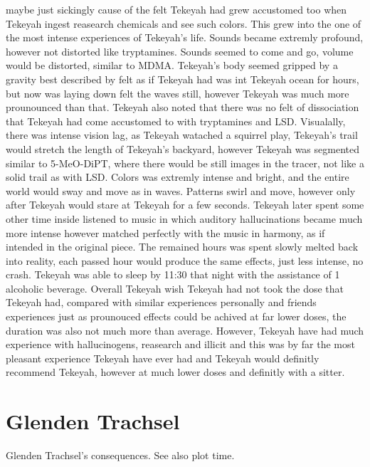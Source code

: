 \documentclass[12pt]{book}
\begin{document}
maybe just sickingly cause of the felt Tekeyah had grew accustomed too when Tekeyah ingest reasearch chemicals and see such colors. This grew into the one of the most intense experiences of Tekeyah's life. Sounds became extremly profound, however not distorted like tryptamines. Sounds seemed to come and go, volume would be distorted, similar to MDMA. Tekeyah's body seemed gripped by a gravity best described by felt as if Tekeyah had was int Tekeyah ocean for hours, but now was laying down felt the waves still, however Tekeyah was much more prounounced than that. Tekeyah also noted that there was no felt of dissociation that Tekeyah had come accustomed to with tryptamines and LSD. Visualally, there was intense vision lag, as Tekeyah watached a squirrel play, Tekeyah's trail would stretch the length of Tekeyah's backyard, however Tekeyah was segmented similar to 5-MeO-DiPT, where there would be still images in the tracer, not like a solid trail as with LSD. Colors was extremly intense and bright, and the entire world would sway and move as in waves. Patterns swirl and move, however only after Tekeyah would stare at Tekeyah for a few seconds. Tekeyah later spent some other time inside listened to music in which auditory hallucinations became much more intense however matched perfectly with the music in harmony, as if intended in the original piece. The remained hours was spent slowly melted back into reality, each passed hour would produce the same effects, just less intense, no crash. Tekeyah was able to sleep by 11:30 that night with the assistance of 1 alcoholic beverage. Overall Tekeyah wish Tekeyah had not took the dose that Tekeyah had, compared with similar experiences personally and friends experiences just as prounouced effects could be achived at far lower doses, the duration was also not much more than average. However, Tekeyah have had much experience with hallucinogens, reasearch and illicit and this was by far the most pleasant experience Tekeyah have ever had and Tekeyah would definitly recommend Tekeyah, however at much lower doses and definitly with a sitter.



\chapter{Glenden Trachsel}

Glenden Trachsel's consequences. See also plot time.
\end{document}

